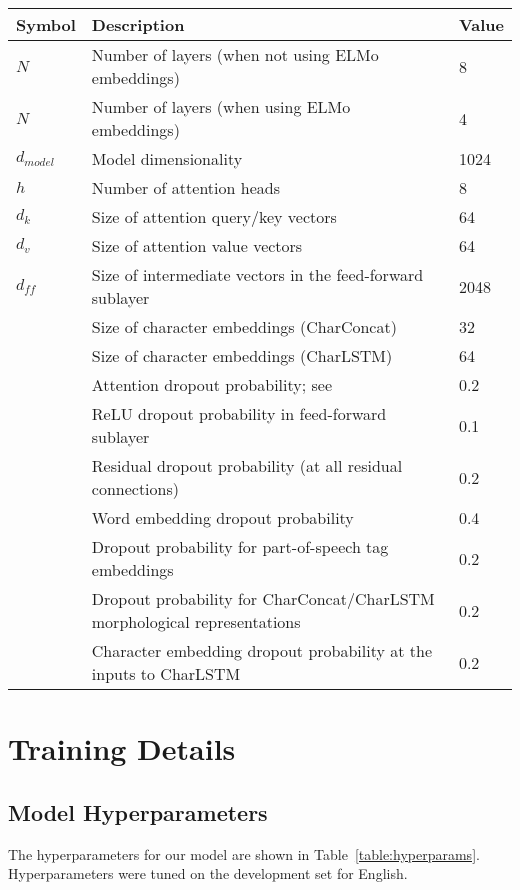 \documentclass[11pt,a4paper]{article}
\begin{document}
\begin{table*}[ht]
\begin{center}
\begin{tabular}{@{}lp{}l@{}}
\toprule
Symbol & Description & Value \\
\midrule
$N$ & Number of layers (when not using ELMo embeddings) & 8 \\
$N$ & Number of layers (when using ELMo embeddings) & 4 \\
$d_{model}$ & Model dimensionality & 1024 \\
$h$ & Number of attention heads & 8 \\
$d_k$ & Size of attention query/key vectors & 64 \\
$d_v$ & Size of attention value vectors & 64 \\
$d_{ff}$ & Size of intermediate vectors in the feed-forward sublayer & 2048 \\
& Size of character embeddings (CharConcat) & 32 \\
& Size of character embeddings (CharLSTM) & 64 \\
\midrule
& Attention dropout probability; see \citet{vaswani_attention_2017} & 0.2 \\
& ReLU dropout probability in feed-forward sublayer & 0.1 \\
& Residual dropout probability (at all residual connections) & 0.2 \\
& Word embedding dropout probability & 0.4 \\
& Dropout probability for part-of-speech tag embeddings& 0.2 \\
& Dropout probability for CharConcat/CharLSTM morphological representations & 0.2 \\
& Character embedding dropout probability at the inputs to CharLSTM & 0.2 \\
\bottomrule
\end{tabular}
\end{center}
\caption{
\label{table:hyperparams}
Model hyperparameters used for all of our experiments.
}
\end{table*}
\newpage

\section{Training Details}
\label{sec:hyperparams}

\subsection{Model Hyperparameters}
The hyperparameters for our model are shown in Table~\ref{table:hyperparams}. Hyperparameters were tuned on the development set for English.
\end{document}
